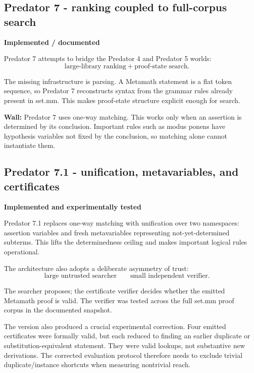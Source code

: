 \documentclass[11pt]{article}
\newcommand{\implemented}{\textbf{Implemented / documented}}
\newcommand{\tested}{\textbf{Implemented and experimentally tested}}
\begin{document}
\subsection{Predator 7 - ranking coupled to full-corpus search}

\begin{statusbox}\implemented\end{statusbox}

Predator 7 attempts to bridge the Predator 4 and Predator 5 worlds:
\[
\boxed{\text{large-library ranking}} + \boxed{\text{proof-state search}}.
\]

The missing infrastructure is parsing. A Metamath statement is a flat token sequence, so Predator 7 reconstructs syntax from the grammar rules already present in set.mm. This makes proof-state structure explicit enough for search.

\textbf{Wall:} Predator 7 uses one-way matching. This works only when an assertion is determined by its conclusion. Important rules such as modus ponens have hypothesis variables not fixed by the conclusion, so matching alone cannot instantiate them.

\subsection{Predator 7.1 - unification, metavariables, and certificates}

\begin{statusbox}\tested\end{statusbox}

Predator 7.1 replaces one-way matching with unification over two namespaces: assertion variables and fresh metavariables representing not-yet-determined subterms. This lifts the determinedness ceiling and makes important logical rules operational.

The architecture also adopts a deliberate asymmetry of trust:
\[
\boxed{\text{large untrusted searcher}}\qquad\boxed{\text{small independent verifier}}.
\]

The searcher proposes; the certificate verifier decides whether the emitted Metamath proof is valid. The verifier was tested across the full set.mm proof corpus in the documented snapshot.

The version also produced a crucial experimental correction. Four emitted certificates were formally valid, but each reduced to finding an earlier duplicate or substitution-equivalent statement. They were valid lookups, not substantive new derivations. The corrected evaluation protocol therefore needs to exclude trivial duplicate/instance shortcuts when measuring nontrivial reach.
\end{document}
